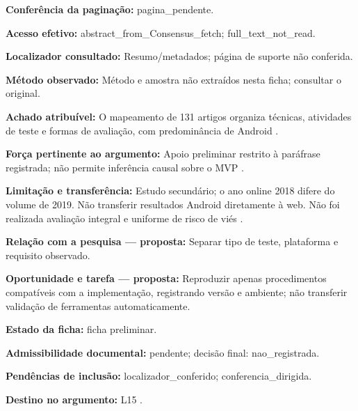 \noindent\textbf{Conferência da paginação:} pagina\_pendente.\par\medskip

\noindent\textbf{Acesso efetivo:} abstract\_from\_Consensus\_fetch; full\_text\_not\_read.\par\medskip

\noindent\textbf{Localizador consultado:} Resumo/metadados; página de suporte não conferida.\par\medskip

\noindent\textbf{Método observado:} Método e amostra não extraídos nesta ficha; consultar o original.\par\medskip

\noindent\textbf{Achado atribuível:} O mapeamento de 131 artigos organiza técnicas, atividades de teste e formas de avaliação, com predominância de Android \citep{eng03}.\par\medskip

\noindent\textbf{Força pertinente ao argumento:} Apoio preliminar restrito à paráfrase registrada; não permite inferência causal sobre o MVP \citep{eng03}.\par\medskip

\noindent\textbf{Limitação e transferência:} Estudo secundário; o ano online 2018 difere do volume de 2019. Não transferir resultados Android diretamente à web. Não foi realizada avaliação integral e uniforme de risco de viés \citep{eng03}.\par\medskip

\noindent\textbf{Relação com a pesquisa — proposta:} Separar tipo de teste, plataforma e requisito observado.\par\medskip

\noindent\textbf{Oportunidade e tarefa — proposta:} Reproduzir apenas procedimentos compatíveis com a implementação, registrando versão e ambiente; não transferir validação de ferramentas automaticamente.\par\medskip

\noindent\textbf{Estado da ficha:} ficha preliminar.\par\medskip

\noindent\textbf{Admissibilidade documental:} pendente; decisão final: nao\_registrada.\par\medskip

\noindent\textbf{Pendências de inclusão:} localizador\_conferido; conferencia\_dirigida.\par\medskip

\noindent\textbf{Destino no argumento:} L15 .

